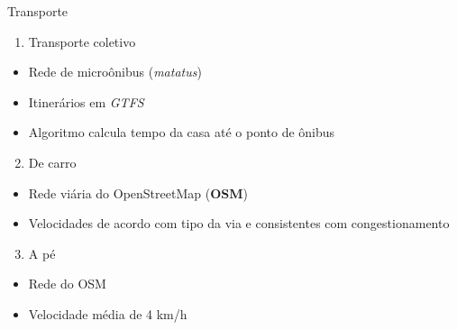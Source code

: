 \documentclass[
  ignorenonframetext,
  aspectratio=169]{beamer}
\providecommand{\tightlist}{%
  \setlength{\itemsep}{0pt}\setlength{\parskip}{0pt}}
\begin{document}
\begin{frame}{Transporte}
\protect\hypertarget{transporte}{}
\begin{enumerate}
\tightlist
\item
  Transporte coletivo
\end{enumerate}

\begin{itemize}
\tightlist
\item
  Rede de microônibus (\emph{matatus})
\item
  Itinerários em \emph{GTFS}
\item
  Algoritmo calcula tempo da casa até o ponto de ônibus
\end{itemize}

\begin{enumerate}
\setcounter{enumi}{1}
\tightlist
\item
  De carro
\end{enumerate}

\begin{itemize}
\tightlist
\item
  Rede viária do OpenStreetMap (\textbf{OSM})
\item
  Velocidades de acordo com tipo da via e consistentes com
  congestionamento
\end{itemize}

\begin{enumerate}
\setcounter{enumi}{2}
\tightlist
\item
  A pé
\end{enumerate}

\begin{itemize}
\tightlist
\item
  Rede do OSM
\item
  Velocidade média de 4 km/h
\end{itemize}
\end{frame}
\end{document}
